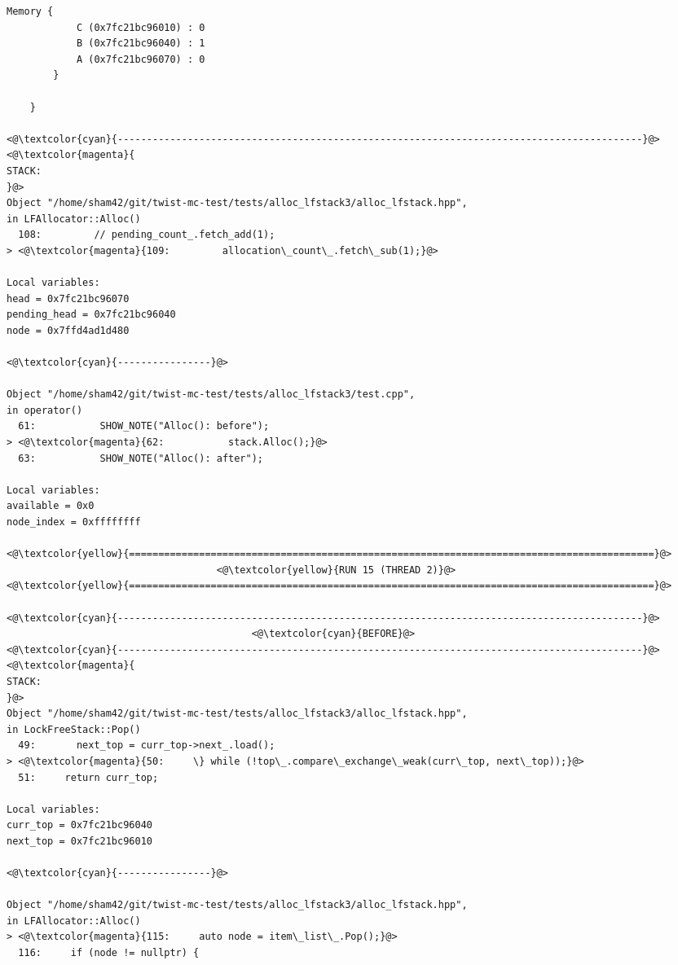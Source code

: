 \begin{adjustwidth}{-3.3cm}{-1cm}
\begin{allintypewriter}
\begin{multicols*}{2}
\begin{lstlisting}[numbers=none]
	    Memory {
		    C (0x7fc21bc96010) : 0
		    B (0x7fc21bc96040) : 1
		    A (0x7fc21bc96070) : 0
	    }

    }

<@\textcolor{cyan}{------------------------------------------------------------------------------------------}@>
<@\textcolor{magenta}{
STACK:
}@>
Object "/home/sham42/git/twist-mc-test/tests/alloc_lfstack3/alloc_lfstack.hpp",
in LFAllocator::Alloc()
  108:         // pending_count_.fetch_add(1);
> <@\textcolor{magenta}{109:         allocation\_count\_.fetch\_sub(1);}@>

Local variables: 
head = 0x7fc21bc96070
pending_head = 0x7fc21bc96040
node = 0x7ffd4ad1d480

<@\textcolor{cyan}{----------------}@>

Object "/home/sham42/git/twist-mc-test/tests/alloc_lfstack3/test.cpp",
in operator()
  61:           SHOW_NOTE("Alloc(): before");
> <@\textcolor{magenta}{62:           stack.Alloc();}@>
  63:           SHOW_NOTE("Alloc(): after");

Local variables: 
available = 0x0
node_index = 0xffffffff

<@\textcolor{yellow}{==========================================================================================}@>
                                    <@\textcolor{yellow}{RUN 15 (THREAD 2)}@>
<@\textcolor{yellow}{==========================================================================================}@>

<@\textcolor{cyan}{------------------------------------------------------------------------------------------}@>
                                          <@\textcolor{cyan}{BEFORE}@>
<@\textcolor{cyan}{------------------------------------------------------------------------------------------}@>
<@\textcolor{magenta}{
STACK:
}@>
Object "/home/sham42/git/twist-mc-test/tests/alloc_lfstack3/alloc_lfstack.hpp",
in LockFreeStack::Pop()
  49:       next_top = curr_top->next_.load();
> <@\textcolor{magenta}{50:     \} while (!top\_.compare\_exchange\_weak(curr\_top, next\_top));}@>
  51:     return curr_top;

Local variables: 
curr_top = 0x7fc21bc96040
next_top = 0x7fc21bc96010

<@\textcolor{cyan}{----------------}@>

Object "/home/sham42/git/twist-mc-test/tests/alloc_lfstack3/alloc_lfstack.hpp",
in LFAllocator::Alloc()
> <@\textcolor{magenta}{115:     auto node = item\_list\_.Pop();}@>
  116:     if (node != nullptr) {


\end{lstlisting}
\end{multicols*}
\end{allintypewriter}
\end{adjustwidth}
